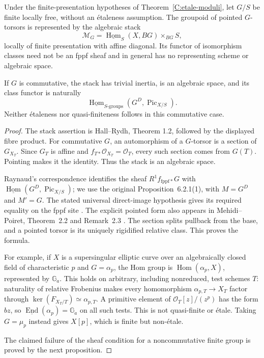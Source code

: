 \begin{theorem}
\label{C:finite-flat-stack}
Under the finite-presentation hypotheses of
Theorem~\ref{C:etale-moduli}, let $G/S$ be finite locally free, without
an \'etaleness assumption.  The groupoid of pointed $G$-torsors is
represented by the algebraic stack
\[
\mathcal M_G=
\underline{\operatorname{Hom}}_S(X,BG)
\mathbin{\times}_{BG}S,
\]
locally of finite presentation with affine diagonal.  Its functor of
isomorphism classes need not be an fppf sheaf and in general has no
representing scheme or algebraic space.

If $G$ is commutative, the stack has trivial inertia, is an algebraic
space, and its class functor is naturally
\[
\underline{\operatorname{Hom}}_{S\text{-groups}}
(G^D,\operatorname{Pic}_{X/S}).
\]
Neither \'etaleness nor quasi-finiteness follows in this commutative
case.
\end{theorem}

\begin{proof}
The stack assertion is Hall--Rydh, Theorem 1.2, followed by the
displayed fibre product.  For commutative $G$, an automorphism of a
$G$-torsor is a section of $G_{X_T}$.  Since $G_T$ is affine and
$f_{T*}\mathcal O_{X_T}=\mathcal O_T$, every such section comes from
$G(T)$.  Pointing makes it the identity.  Thus the stack is an
algebraic space.

Raynaud's correspondence identifies the sheaf
$R^1 f_{\mathrm{fppf}*}G$ with
$\underline{\operatorname{Hom}}(G^D,\operatorname{Pic}_{X/S})$;
we use the original Proposition~6.2.1(1), with $M=G^D$ and $M'=G$.
The stated universal direct-image hypothesis gives its required
equality on the fppf site
\cite[Proposition~6.2.1(1), pp.~50--51]{C_Raynaud1970}.
The explicit pointed form also appears in Mehidi--Poiret, Theorem~2.2
and Remark~2.3 \cite{C_MehidiPoiret2025}.
The section splits pullback from the base, and a pointed torsor is
its uniquely rigidified relative class.  This proves the formula.

For example, if $X$ is a supersingular elliptic curve over an
algebraically closed field of characteristic $p$ and $G=\alpha_p$,
the Hom group is $\operatorname{Hom}(\alpha_p,X)$, represented by
$\mathbb G_a$.  This holds on arbitrary, including nonreduced, test
schemes $T$: naturality of relative Frobenius makes every homomorphism
$\alpha_{p,T}\to X_T$ factor through
$\ker(F_{X_T/T})\simeq\alpha_{p,T}$.  A primitive element of
$\mathcal O_T[z]/(z^p)$ has the form $bz$, so
$\underline{\operatorname{End}}(\alpha_p)=\mathbb G_a$ on all such
tests.  This is not
quasi-finite or \'etale.  Taking $G=\mu_p$ instead gives $X[p]$,
which is finite but non-\'etale.

The claimed failure of the sheaf condition for a noncommutative finite
group is proved by the next proposition.
\end{proof}

